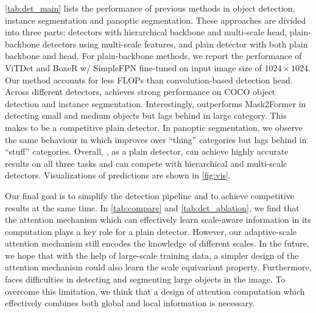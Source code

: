      \cref{tab:det_main} lists the performance of \ours \vs previous methods in object detection, instance segmentation and panoptic segmentation. 
    These approaches are divided into three parts: detectors with hierarchical backbone and multi-scale head, plain-backbone detectors using multi-scale features, and plain detector with both plain backbone and head.
    For plain-backbone methods, we report the performance of ViTDet \citep{li2022vitdet} and BoxeR w/ SimpleFPN \citep{nguyen2022boxer} fine-tuned on input image size of $1024\times1024$. Our method accounts for less FLOPs than convolution-based detection head. Across different detectors, \ours achieves strong performance on COCO object detection and instance segmentation. Interestingly, \ours outperforms Mask2Former \citep{cheng2022mask2former} in detecting small and medium objects but lags behind in large category. This makes \ours to be a competitive plain detector. In panoptic segmentation, we observe the same behaviour in which \ours improves over ``thing'' categories but lags behind in ``stuff'' categories. Overall, \ours, as a plain detector, can achieve highly accurate results on all three tasks and can compete with hierarchical and multi-scale detectors. Visualizations of \ours predictions are shown in \cref{fig:vis}.
    
     Our final goal is to simplify the detection pipeline and to achieve competitive results at the same time. In \cref{tab:compare} and \cref{tab:det_ablation}, we find that the attention mechanism which can effectively learn scale-aware information in its computation plays a key role for a plain detector. However, our adaptive-scale attention mechanism still encodes the knowledge of different scales. In the future, we hope that with the help of large-scale training data, a simpler design of the attention mechanism could also learn the scale equivariant property. Furthermore, \ours faces difficulties in detecting and segmenting large objects in the image. To overcome this limitation, we think that a design of attention computation which effectively combines both global and local information is necessary.
    

